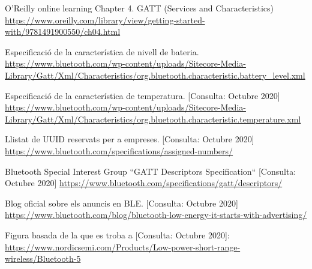 \begin{thebibliography}{2}
O’Reilly online learning
Chapter 4. GATT (Services and Characteristics)  \newline
\href{https://www.oreilly.com/library/view/getting-started-with/9781491900550/ch04.html}{https://www.oreilly.com/library/view/getting-started-with/9781491900550/ch04.html}

Especificació de la característica de nivell de bateria.\newline
\href{https://www.bluetooth.com/wp-content/uploads/Sitecore-Media-Library/Gatt/Xml/Characteristics/org.bluetooth.characteristic.battery\_level.xml}{https://www.bluetooth.com/wp-content/uploads/Sitecore-Media-Library/Gatt/Xml/Characteristics/org.bluetooth.characteristic.battery\_level.xml}

Especificació de la característica de temperatura.
[Consulta: Octubre 2020] \newline
\href{https://www.bluetooth.com/wp-content/uploads/Sitecore-Media-Library/Gatt/Xml/Characteristics/org.bluetooth.characteristic.temperature.xml}{https://www.bluetooth.com/wp-content/uploads/Sitecore-Media-Library/Gatt/Xml/Characteristics/org.bluetooth.characteristic.temperature.xml}

Llistat de UUID reservats per a empreses.
[Consulta: Octubre 2020]\newline
\href{https://www.bluetooth.com/specifications/assigned-numbers/}{https://www.bluetooth.com/specifications/assigned-numbers/}

Bluetooth Special Interest Group
``GATT Descriptors Specification``
[Consulta: Octubre 2020]\newline
\href{https://www.bluetooth.com/specifications/gatt/descriptors/}{https://www.bluetooth.com/specifications/gatt/descriptors/}

Blog oficial sobre els anuncis en BLE. [Consulta: Octubre 2020]\newline
\href{https://www.bluetooth.com/blog/bluetooth-low-energy-it-starts-with-advertising/}{ https://www.bluetooth.com/blog/bluetooth-low-energy-it-starts-with-advertising/}

Figura basada de la que es troba a [Consulta: Octubre 2020]:\newline
\href{https://www.nordicsemi.com/Products/Low-power-short-range-wireless/Bluetooth-5}{https://www.nordicsemi.com/Products/Low-power-short-range-wireless/Bluetooth-5}


\end{thebibliography}

